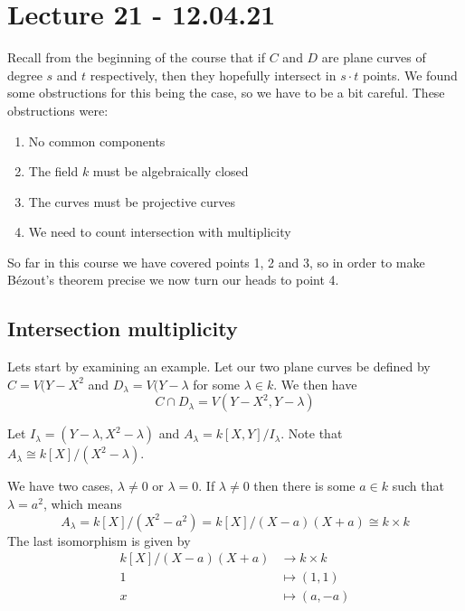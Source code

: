 



\section{Lecture 21 - 12.04.21}

Recall from the beginning of the course that if $C$ and $D$ are plane curves of degree $s$ and $t$ respectively, then they hopefully intersect in $s\cdot t$ points. We found some obstructions for this being the case, so we have to be a bit careful. These obstructions were: 

\begin{enumerate}
    \item No common components
    \item The field $k$ must be algebraically closed
    \item The curves must be projective curves
    \item We need to count intersection with multiplicity
\end{enumerate}

So far in this course we have covered points 1, 2 and 3, so in order to make Bézout's theorem precise we now turn our heads to point 4.  

\subsection{Intersection multiplicity}

Lets start by examining an example. Let our two plane curves be defined by $C=V(Y-X^2$ and $D_\lambda=V(Y-\lambda$ for some $\lambda\in k$. We then have 
\begin{equation*}
    C\cap D_\lambda = V(Y-X^2, Y-\lambda)
\end{equation*}

Let $I_\lambda = (Y-\lambda, X^2-\lambda)$ and $A_\lambda= k[X, Y]/I_\lambda$. Note that $A_\lambda\cong k[X]/(X^2-\lambda)$. 

We have two cases, $\lambda \neq 0$ or $\lambda = 0$. If $\lambda \neq 0$ then there is some $a\in k$ such that $\lambda = a^2$, which means 
\begin{equation*}
    A_\lambda= k[X]/(X^2-a^2)=k[X]/(X-a)(X+a)\cong k\times k
\end{equation*}
The last isomorphism is given by
\begin{align*}
    k[X]/(X-a)(X+a) &\longrightarrow k\times k \\
    1&\longmapsto (1, 1) \\
    x&\longmapsto (a, -a)
\end{align*}

